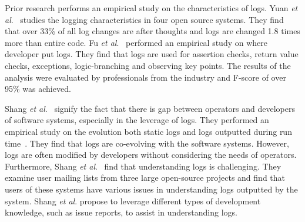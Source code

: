 
Prior research performs an empirical study on the characteristics of logs. Yuan \textsl{et al$.$}~\cite{Characterizinglogs} studies the logging characteristics in four open source systems. They find that over 33\% of all log changes are after thoughts and logs are changed 1.8 times more than entire code. Fu \textsl{et al$.$}~\cite{Fu1} performed an empirical study on where developer put logs. They find that logs are used for assertion checks, return value checks, exceptions, logic-branching and observing key points. The results of the analysis were evaluated by professionals from the industry and F-score of over 95\% was achieved. 


Shang \textsl{et al$.$}~\cite{IanGap} signify the fact that there is gap between operators and developers of software systems, especially in the leverage of logs. They performed an empirical study on the evolution both static logs and logs outputted during run time~\cite{EMSEIAN,PaperIanCIIII}. They find that logs are co-evolving with the software systems. However, logs are often modified by developers without considering the needs of operators. Furthermore, Shang\textsl{ et al$.$}~\cite{IanIcesm} find that understanding logs is challenging. They examine user mailing lists from three large open-source projects and find that users of these systems have various issues in understanding logs outputted by the system. Shang\textsl{ et al$.$} propose to leverage different types of development knowledge, such as issue reports, to assist in understanding logs. 

